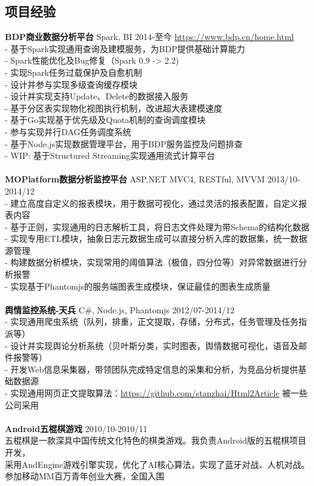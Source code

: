 \documentclass[UTF8,margin,line]{res}
\begin{document}
\begin{resume}
\section{\sc 项目经验}
\textbf{BDP商业数据分析平台} Spark, BI 2014-至今 \url{https://www.bdp.cn/home.html} \\
- 基于Spark实现通用查询及建模服务，为BDP提供基础计算能力 \\
- Spark性能优化及Bug修复（Spark 0.9 -> 2.2) \\
- 实现Spark任务过载保护及自愈机制 \\
- 设计并参与实现多级查询缓存模块 \\
- 设计并实现支持Update、Delete的数据接入服务 \\
- 基于分区表实现物化视图执行机制，改进超大表建模速度 \\
- 基于Go实现基于优先级及Quota机制的查询调度模块 \\
- 参与实现并行DAG任务调度系统 \\
- 基于Node.js实现数据管理平台，用于BDP服务监控及问题排查 \\
- WIP: 基于Structured Streaming实现通用流式计算平台 \\
\\
\textbf{MOPlatform数据分析监控平台} ASP.NET MVC4, RESTful, MVVM 2013/10-2014/12 \\
- 建立高度自定义的报表模块，用于数据可视化，通过灵活的报表配置，自定义报表内容 \\
- 基于正则，实现通用的日志解析工具，将日志文件处理为带Schema的结构化数据 \\
- 实现专用ETL模块，抽象日志元数据生成可以直接分析入库的数据集，统一数据源管理 \\
- 构建数据分析模块，实现常用的阈值算法（极值，四分位等）对异常数据进行分析报警 \\
- 实现基于Phantomjs的服务端图表生成模块，保证最佳的图表生成质量 \\
\\
\textbf{舆情监控系统-天兵} C\#, Node.js, Phantomjs 2012/07-2014/12 \\
- 实现通用爬虫系统（队列，排重，正文提取，存储，分布式，任务管理及任务指派等） \\
- 设计并实现舆论分析系统（贝叶斯分类，实时图表，舆情数据可视化，语音及邮件报警等） \\
- 开发Web信息采集器，带领团队完成特定信息的采集和分析，为竞品分析提供基础数据源 \\
- 实现通用网页正文提取算法：\url{https://github.com/stanzhai/Html2Article} 被一些公司采用 \\
\\
\textbf{Android五棍棋游戏}  2010/10-2010/11 \\
五棍棋是一款深具中国传统文化特色的棋类游戏。我负责Android版的五棍棋项目开发，\\
采用AndEngine游戏引擎实现，优化了AI核心算法，实现了蓝牙对战、人机对战。\\
参加移动MM百万青年创业大赛，全国入围


\end{resume}
\end{document}
